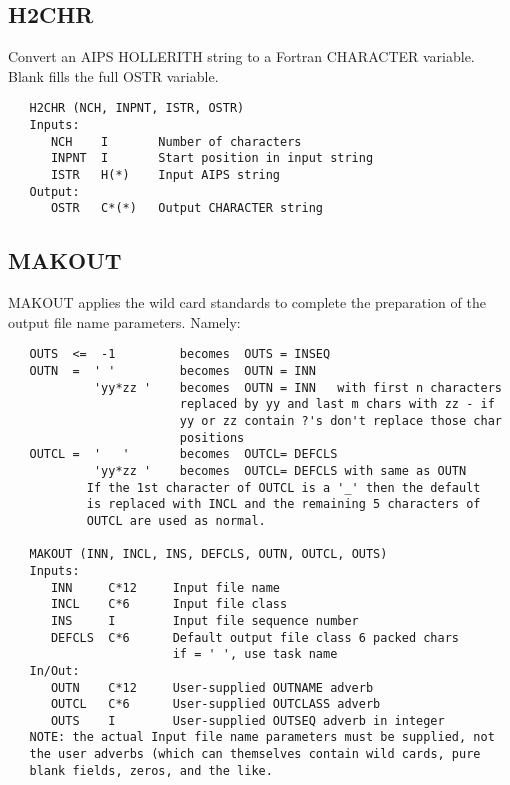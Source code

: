 \subsection{H2CHR}
Convert an AIPS HOLLERITH string to a Fortran CHARACTER variable.
Blank fills the full OSTR variable.
\begin{verbatim}
   H2CHR (NCH, INPNT, ISTR, OSTR)
   Inputs:
      NCH    I       Number of characters
      INPNT  I       Start position in input string
      ISTR   H(*)    Input AIPS string
   Output:
      OSTR   C*(*)   Output CHARACTER string
\end{verbatim}

\subsection{MAKOUT}
MAKOUT applies the wild card standards to complete the preparation
of the output file name parameters. Namely:
\begin{verbatim}
   OUTS  <=  -1         becomes  OUTS = INSEQ
   OUTN  =  ' '         becomes  OUTN = INN
            'yy*zz '    becomes  OUTN = INN   with first n characters
                        replaced by yy and last m chars with zz - if
                        yy or zz contain ?'s don't replace those char
                        positions
   OUTCL =  '   '       becomes  OUTCL= DEFCLS
            'yy*zz '    becomes  OUTCL= DEFCLS with same as OUTN
           If the 1st character of OUTCL is a '_' then the default
           is replaced with INCL and the remaining 5 characters of
           OUTCL are used as normal.

   MAKOUT (INN, INCL, INS, DEFCLS, OUTN, OUTCL, OUTS)
   Inputs:
      INN     C*12     Input file name
      INCL    C*6      Input file class
      INS     I        Input file sequence number
      DEFCLS  C*6      Default output file class 6 packed chars
                       if = ' ', use task name
   In/Out:
      OUTN    C*12     User-supplied OUTNAME adverb
      OUTCL   C*6      User-supplied OUTCLASS adverb
      OUTS    I        User-supplied OUTSEQ adverb in integer
   NOTE: the actual Input file name parameters must be supplied, not
   the user adverbs (which can themselves contain wild cards, pure
   blank fields, zeros, and the like.
\end{verbatim}

